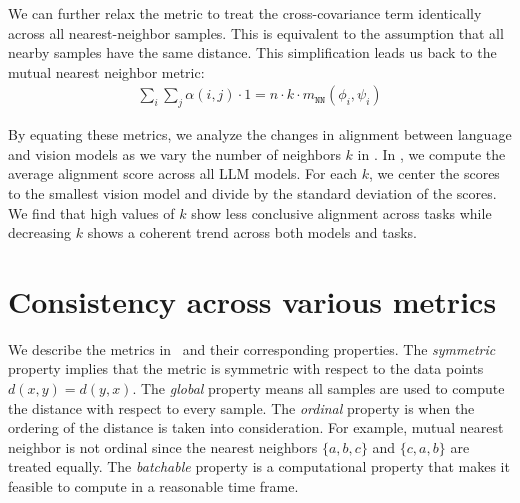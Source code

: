 
We can further relax the metric to treat the cross-covariance term identically across all nearest-neighbor samples. This is equivalent to the assumption that all nearby samples have the same distance. This simplification leads us back to the mutual nearest neighbor metric:
\begin{align}
\sum_i \sum_{j} \alpha(i, j) \cdot 1 = n \cdot k \cdot m_{\texttt{NN}}(\phi_i, \psi_i)
\end{align}


By equating these metrics, we analyze the changes in alignment between language and vision models as we vary the number of neighbors $k$ in . In , we compute the average alignment score across all LLM models. For each $k$, we center the scores to the smallest vision model and divide by the standard deviation of the scores. We find that high values of $k$ show less conclusive alignment across tasks while decreasing $k$ shows a coherent trend across both models and tasks.

\newpage
\section{Consistency across various metrics}
\label{app:other-metrics}

We describe the metrics in~ and their corresponding properties. The \textit{symmetric} property implies that the metric is symmetric with respect to the data points $d(x, y) = d(y, x)$. The \textit{global} property means all samples are used to compute the distance with respect to every sample. The \textit{ordinal} property is when the ordering of the distance is taken into consideration. For example, mutual nearest neighbor is not ordinal since the nearest neighbors $\{a, b, c\}$ and $\{c, a, b\}$ are treated equally. The \textit{batchable} property is a computational property that makes it feasible to compute in a reasonable time frame.

